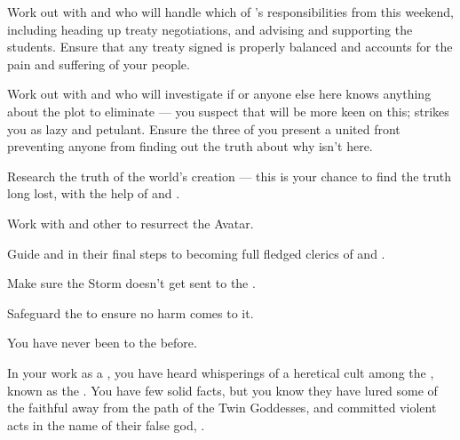\documentclass[char]{GL2020}
\begin{document}
\begin{itemz}
    \item Work out with \cJuniorStatesman{} and \cChupLeader{} who will handle which of \cHeadDiplomat{}’s responsibilities from this weekend, including heading up treaty negotiations, and advising and supporting the students. Ensure that any treaty signed is properly balanced and accounts for the pain and suffering of your people.
    \item Work out with \cJuniorStatesman{} and \cChupLeader{} who will investigate if \cDiplomat{} or anyone else here knows anything about the plot to eliminate \cHeadDiplomat{} — you suspect that \cJuniorStatesman{} will be more keen on this; \cChupLeader{} strikes you as lazy and petulant. Ensure the three of you present a united front preventing anyone from finding out the truth about why \cHeadDiplomat{} isn't here.
    \item Research the truth of the world’s creation — this is your chance to find the truth long lost, with the help of \cHeadScientist{} and \cScholarship{}.
    \item Work with \cFlowPriest{} and other \pShippies{} to resurrect the \cEbb{} Avatar.
\end{itemz}

\begin{itemz}
    \item Guide \cInitiate{} and \cWarlordDaughter{} in their final steps to becoming full fledged clerics of \cEbb{} and \cFlow{}.
    \item Make sure the Storm doesn't get sent to the \pShip{}.
    \item Safeguard the \iChalice{} to ensure no harm comes to it.
\end{itemz}

\begin{itemz}[Notes]
    \item You have never been to the \pSchool{} before.
    \item In your work as a \cEbbPriest{\cleric}, you have heard whisperings of a heretical cult among the \pShip{}, known as the \pGoaties{}. You have few solid facts, but you know they have lured some of the faithful away from the path of the Twin Goddesses, and committed violent acts in the name of their false god, \cGenesis{\intro}.
\end{itemz}
\end{document}
